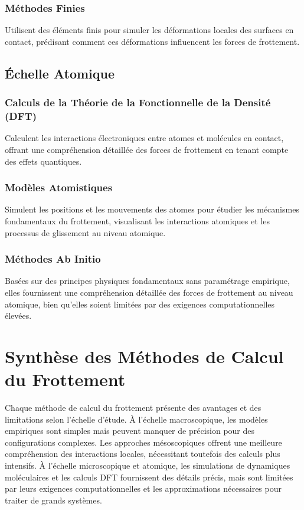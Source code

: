\subsubsection{Méthodes Finies}
Utilisent des éléments finis pour simuler les déformations locales des surfaces en contact, prédisant comment ces déformations influencent les forces de frottement.

\subsection{Échelle Atomique}
\label{subsec:atomique}

\subsubsection{Calculs de la Théorie de la Fonctionnelle de la Densité (DFT)}
Calculent les interactions électroniques entre atomes et molécules en contact, offrant une compréhension détaillée des forces de frottement en tenant compte des effets quantiques.

\subsubsection{Modèles Atomistiques}
Simulent les positions et les mouvements des atomes pour étudier les mécanismes fondamentaux du frottement, visualisant les interactions atomiques et les processus de glissement au niveau atomique.

\subsubsection{Méthodes Ab Initio}
Basées sur des principes physiques fondamentaux sans paramétrage empirique, elles fournissent une compréhension détaillée des forces de frottement au niveau atomique, bien qu'elles soient limitées par des exigences computationnelles élevées.

\section{Synthèse des Méthodes de Calcul du Frottement}

Chaque méthode de calcul du frottement présente des avantages et des limitations selon l'échelle d'étude. À l'échelle macroscopique, les modèles empiriques sont simples mais peuvent manquer de précision pour des configurations complexes. Les approches mésoscopiques offrent une meilleure compréhension des interactions locales, nécessitant toutefois des calculs plus intensifs. À l'échelle microscopique et atomique, les simulations de dynamiques moléculaires et les calculs DFT fournissent des détails précis, mais sont limitées par leurs exigences computationnelles et les approximations nécessaires pour traiter de grands systèmes.

